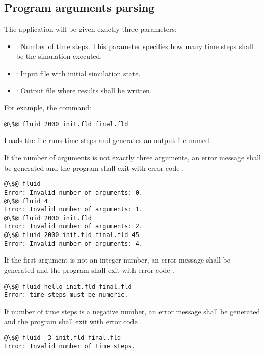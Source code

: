 \subsection{Program arguments parsing}

The application will be given exactly three parameters:

\begin{itemize}
\item {}: Number of time steps. This parameter specifies how many
time steps shall be the simulation executed.
\item {}: Input file with initial simulation state.
\item {}: Output file where results shall be written.
\end{itemize}

For example, the command:

\begin{lstlisting}[style=terminal,escapechar=@]
@\$@ fluid 2000 init.fld final.fld
\end{lstlisting}

Loads the file  runs  time steps and generates an
output file named .

If the number of arguments is not exactly three arguments, an error message
shall be generated and the program shall exit with error code .

\begin{lstlisting}[style=terminal,escapechar=@]
@\$@ fluid 
Error: Invalid number of arguments: 0.
@\$@ fluid 4
Error: Invalid number of arguments: 1.
@\$@ fluid 2000 init.fld
Error: Invalid number of arguments: 2.
@\$@ fluid 2000 init.fld final.fld 45
Error: Invalid number of arguments: 4.
\end{lstlisting}

If the first argument is not an integer number, an error message shall be
generated and the program shall exit with error code .

\begin{lstlisting}[style=terminal,escapechar=@]
@\$@ fluid hello init.fld final.fld
Error: time steps must be numeric.
\end{lstlisting}

If number of time steps is a negative number, an error message shall be
generated and the program shall exit with error code .

\begin{lstlisting}[style=terminal,escapechar=@]
@\$@ fluid -3 init.fld final.fld
Error: Invalid number of time steps.
\end{lstlisting}

